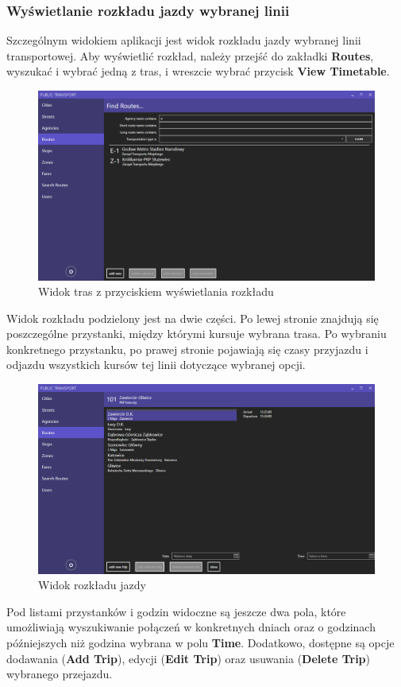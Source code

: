 \documentclass[10pt,a4paper]{article}
\begin{document}
\subsubsection{Wyświetlanie rozkładu jazdy wybranej linii}
Szczególnym widokiem aplikacji jest widok rozkładu jazdy wybranej linii transportowej. Aby wyświetlić rozkład, należy przejść do zakładki \textbf{Routes}, wyszukać i wybrać jedną z tras, i wreszcie wybrać przycisk \textbf{View Timetable}.
\begin{figure}[H]
	\centering
	\includegraphics[width=15cm]{screenshots/09_filter_route.png}
	\caption{Widok tras z przyciskiem wyświetlania rozkładu}
\end{figure}
Widok rozkładu podzielony jest na dwie części. Po lewej stronie znajdują się poszczególne przystanki, między którymi kursuje wybrana trasa. Po wybraniu konkretnego przystanku, po prawej stronie pojawiają się czasy przyjazdu i odjazdu wszystkich kursów tej linii dotyczące wybranej opcji.
\begin{figure}[H]
	\centering
	\includegraphics[width=15cm]{screenshots/10_timetable.png}
	\caption{Widok rozkładu jazdy}
\end{figure}
Pod listami przystanków i godzin widoczne są jeszcze dwa pola, które umożliwiają wyszukiwanie połączeń w konkretnych dniach oraz o godzinach późniejszych niż godzina wybrana w polu \textbf{Time}. Dodatkowo, dostępne są opcje dodawania (\textbf{Add Trip}), edycji (\textbf{Edit Trip}) oraz usuwania (\textbf{Delete Trip}) wybranego przejazdu.
\end{document}
